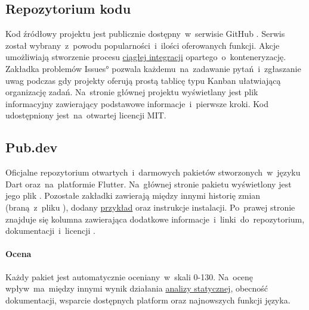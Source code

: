 \subsection{Repozytorium kodu}
Kod źródłowy projektu jest publicznie dostępny~w~serwisie GitHub \cite{RoundSpot_GitHub}. Serwis został wybrany~z~powodu popularności~i~ilości oferowanych funkcji. Akcje umożliwiają stworzenie procesu \hyperref[sec:rs_ci]{ciągłej integracji} opartego~o~konteneryzację. Zakładka problemów \ang{Issues} pozwala każdemu~na~zadawanie pytań~i~zgłaszanie uwag podczas gdy projekty oferują prostą tablicę typu Kanban ułatwiającą organizację zadań. Na~stronie głównej projektu wyświetlany jest plik informacyjny  zawierający podstawowe informacje~i~pierwsze kroki. Kod udostępniony jest~na~otwartej licencji MIT.

\subsection{Pub.dev}
Oficjalne repozytorium otwartych~i~darmowych pakietów stworzonych~w~języku Dart oraz~na~platformie Flutter. Na~głównej stronie pakietu wyświetlony jest jego plik . Pozostałe zakładki zawierają między innymi historię zmian (braną~z~pliku ), dodany \hyperref[sec:rs_example]{przykład} oraz instrukcje instalacji. Po~prawej stronie znajduje się kolumna zawierająca dodatkowe informacje~i~linki~do~repozytorium, dokumentacji~i~licencji \cite{RS_Pub_dev}.

\paragraph{Ocena} Każdy pakiet jest automatycznie oceniany~w~skali 0-130. Na~ocenę wpływ~ma~między innymi wynik działania \hyperref[par:static_analysis]{analizy statycznej}, obecność dokumentacji, wsparcie dostępnych platform oraz najnowszych funkcji języka.

\bigskip
{}

